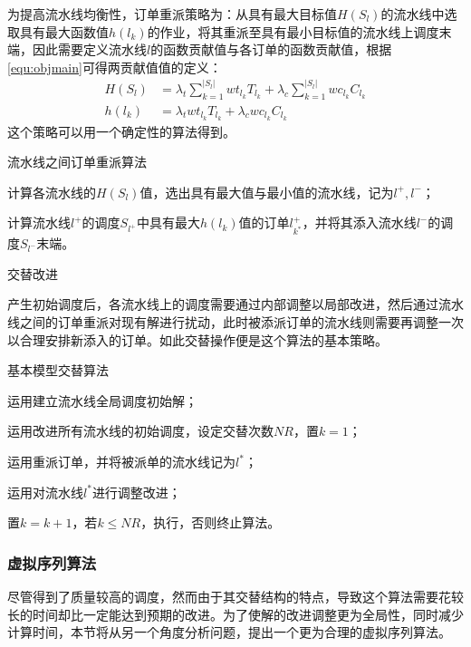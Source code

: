 \begin{asparaenum}
为提高流水线均衡性，订单重派策略为：从具有最大目标值$H(S_l)$的流水线中选取具有最大函数值$h(l_k)$的作业，将其重派至具有最小目标值的流水线上调度末端，因此需要定义流水线$l$的函数贡献值与各订单的函数贡献值，根据\eqref{equ:objmain}可得两贡献值值的定义：
\begin{align}
H(S_l) &= \lambda_t\sum_{k=1}^{|S_l|} wt_{l_k}T_{l_k} + \lambda_c\sum_{k=1}^{|S_l|}wc_{l_k}C_{l_k}\label{equ:linefunct}\\
h(l_k) &= \lambda_t wt_{l_k}T_{l_k} + \lambda_c wc_{l_k}C_{l_k}
\label{equ:itemfunct}
\end{align}
这个策略可以用一个确定性的算法得到。
\begin{algori}
流水线之间订单重派算法\label{alg:between}
\begin{asparaenum}
\renewcommand{\labelenumi}{\bf Step\theenumi~}
\item 计算各流水线的$H(S_l)$值，选出具有最大值与最小值的流水线，记为$l^+, l^-$；
\item 计算流水线$l^+$的调度$S_{l^+}$中具有最大$h(l_k)$值的订单$l^+_{k^*}$，并将其添入流水线$l^-$的调度$S_{l^-}$末端。
\end{asparaenum}
\end{algori}

\item 交替改进
\end{asparaenum} 

产生初始调度后，各流水线上的调度需要通过内部调整以局部改进，然后通过流水线之间的订单重派对现有解进行扰动，此时被添派订单的流水线则需要再调整一次以合理安排新添入的订单。如此交替操作便是这个算法的基本策略。
\begin{algori}
基本模型交替算法\label{alg:inturnbasic}
\begin{asparaenum}
\renewcommand{\labelenumi}{\bf Step\theenumi~}
\item 运用建立流水线全局调度初始解；
\item 运用改进所有流水线的初始调度，设定交替次数$NR$，置$k = 1$；
\item 运用重派订单，并将被派单的流水线记为$l^*$；
\item 运用对流水线$l^*$进行调整改进；
\item 置$k = k+1$，若$k\le NR$，执行，否则终止算法。
\end{asparaenum}
\end{algori}

\subsubsection{虚拟序列算法}
尽管得到了质量较高的调度，然而由于其交替结构的特点，导致这个算法需要花较长的时间却比一定能达到预期的改进。为了使解的改进调整更为全局性，同时减少计算时间，本节将从另一个角度分析问题，提出一个更为合理的虚拟序列算法。

